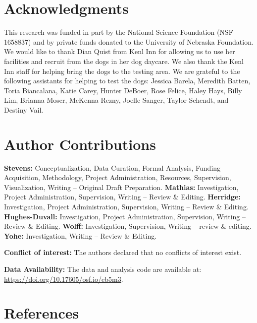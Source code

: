 \documentclass[
  pub,floatsintext]{apa6}
\begin{document}
\hypertarget{acknowledgments}{%
\section{Acknowledgments}\label{acknowledgments}}

This research was funded in part by the National Science Foundation (NSF-1658837) and by private funds donated to the University of Nebraska Foundation. We would like to thank Dian Quist from Kenl Inn for allowing us to use her facilities and recruit from the dogs in her dog daycare. We also thank the Kenl Inn staff for helping bring the dogs to the testing area.
We are grateful to the following assistants for helping to test the dogs:
Jessica Barela,
Meredith Batten,
Toria Biancalana,
Katie Carey,
Hunter DeBoer,
Rose Felice,
Haley Hays,
Billy Lim,
Brianna Moser,
McKenna Rezny,
Joelle Sanger,
Taylor Schendt, and
Destiny Vail.

\hypertarget{author-contributions}{%
\section{Author Contributions}\label{author-contributions}}

\textbf{Stevens:} Conceptualization, Data Curation, Formal Analysis, Funding Acquisition, Methodology, Project Administration, Resources, Supervision, Visualization, Writing -- Original Draft Preparation. \textbf{Mathias:} Investigation, Project Administration, Supervision, Writing -- Review \& Editing. \textbf{Herridge:} Investigation, Project Administration, Supervision, Writing -- Review \& Editing. \textbf{Hughes-Duvall:} Investigation, Project Administration, Supervision, Writing -- Review \& Editing. \textbf{Wolff:} Investigation, Supervision, Writing -- review \& editing. \textbf{Yohe:} Investigation, Writing -- Review \& Editing.

\textbf{Conflict of interest:} The authors declared that no conflicts of interest exist.

\textbf{Data Availability:} The data and analysis code are available at: \url{https://doi.org/10.17605/osf.io/eb5m3}.

\hypertarget{references}{%
\section{References}\label{references}}

\scriptsize

\begingroup
\end{document}
